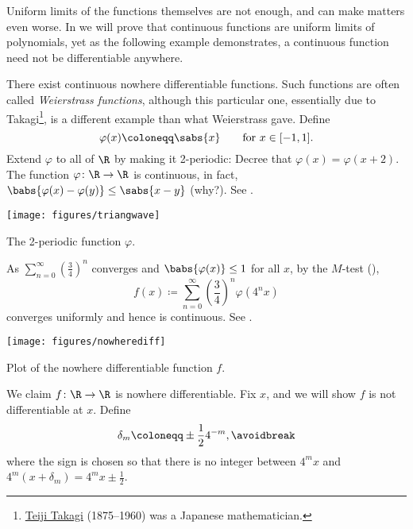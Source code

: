 Uniform limits of the functions themselves are not enough, and can make
matters even worse.  In  we will prove that
continuous functions are uniform limits of polynomials, yet as the following
example demonstrates, a continuous function need not be differentiable
anywhere.

\begin{example}
There exist continuous nowhere differentiable functions.
Such functions are often called
\emph{Weierstrass functions},
although this
particular one, essentially due to
Takagi\footnote{\href{https://en.wikipedia.org/wiki/Teiji_Takagi}{Teiji
Takagi} (1875--1960) was a Japanese mathematician.}, is a different example than what Weierstrass gave.
Define
\begin{equation*}
\varphi(x) \coloneqq \sabs{x} \qquad \text{for } x \in [-1,1] .
\end{equation*}
Extend $\varphi$ to all of $\R$ by making it
2-periodic:
Decree that
$\varphi(x) = \varphi(x+2)$.  The function $\varphi \colon \R \to \R$
is continuous, in fact, $\babs{\varphi(x)-\varphi(y)} \leq \sabs{x-y}$ (why?).
See .
\begin{myfigureht}
\texttt{[image: figures/triangwave]}
\caption{The 2-periodic function $\varphi$.\label{fig:triangwave}}
\end{myfigureht}

As $\sum_{n=0}^\infty {\left(\frac{3}{4}\right)}^n$ converges and $\babs{\varphi(x)} \leq
1$ for all $x$, by the $M$-test
(),
\begin{equation*}
f(x) \coloneqq \sum_{n=0}^\infty 
{\left(\frac{3}{4}\right)}^n \varphi(4^n x)
\end{equation*}
converges uniformly and hence is continuous.
See .

\begin{myfigureht}
\texttt{[image: figures/nowherediff]}
\caption{Plot of the nowhere differentiable function $f$.\label{fig:nowherediff}}
\end{myfigureht}

We claim $f \colon
\R \to \R$ is nowhere differentiable.
Fix $x$, and we will show $f$ is not differentiable at $x$.
Define
\begin{equation*}
\delta_m \coloneqq \pm \frac{1}{2} 4^{-m} ,
\avoidbreak
\end{equation*}
where the sign is chosen so that there is no integer
between $4^m x$ and $4^m(x+\delta_m) = 4^m x \pm \frac{1}{2}$.


\end{example}
